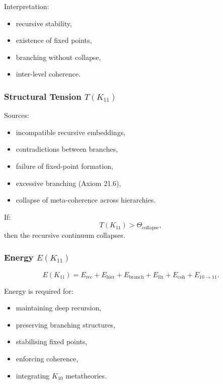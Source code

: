 Interpretation:
\begin{itemize}
    \item recursive stability,
    \item existence of fixed points,
    \item branching without collapse,
    \item inter-level coherence.
\end{itemize}

\subsubsection{Structural Tension $T(K_{11})$}

Sources:
\begin{itemize}
    \item incompatible recursive embeddings,
    \item contradictions between branches,
    \item failure of fixed-point formation,
    \item excessive branching (Axiom 21.6),
    \item collapse of meta-coherence across hierarchies.
\end{itemize}

If:
\[
T(K_{11}) > \Theta_{\mathrm{collapse}},
\]
then the recursive continuum collapses.

\subsubsection{Energy $E(K_{11})$}

\[
E(K_{11})=
E_{\mathrm{rec}}+
E_{\mathrm{hier}}+
E_{\mathrm{branch}}+
E_{\mathrm{fix}}+
E_{\mathrm{coh}}+
E_{10\to11}.
\]

Energy is required for:
\begin{itemize}
    \item maintaining deep recursion,
    \item preserving branching structures,
    \item stabilising fixed points,
    \item enforcing coherence,
    \item integrating $K_{10}$ metatheories.
\end{itemize}

